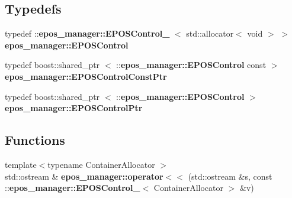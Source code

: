 \subsection*{\-Typedefs}
\begin{DoxyCompactItemize}
\item 
typedef \*
\-::{\bf epos\-\_\-manager\-::\-E\-P\-O\-S\-Control\-\_\-}\*
$<$ std\-::allocator$<$ void $>$ $>$ {\bf epos\-\_\-manager\-::\-E\-P\-O\-S\-Control}
\item 
typedef boost\-::shared\-\_\-ptr\*
$<$ \-::{\bf epos\-\_\-manager\-::\-E\-P\-O\-S\-Control} \*
const  $>$ {\bf epos\-\_\-manager\-::\-E\-P\-O\-S\-Control\-Const\-Ptr}
\item 
typedef boost\-::shared\-\_\-ptr\*
$<$ \-::{\bf epos\-\_\-manager\-::\-E\-P\-O\-S\-Control} $>$ {\bf epos\-\_\-manager\-::\-E\-P\-O\-S\-Control\-Ptr}
\end{DoxyCompactItemize}
\subsection*{\-Functions}
\begin{DoxyCompactItemize}
\item 
{\footnotesize template$<$typename Container\-Allocator $>$ }\\std\-::ostream \& {\bf epos\-\_\-manager\-::operator$<$$<$} (std\-::ostream \&s, const \-::{\bf epos\-\_\-manager\-::\-E\-P\-O\-S\-Control\-\_\-}$<$ \-Container\-Allocator $>$ \&v)
\end{DoxyCompactItemize}
